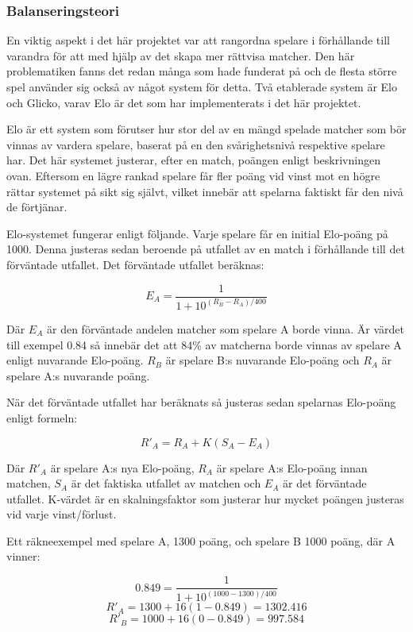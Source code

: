 \documentclass[a4paper, 11pt]{article}
\begin{document}
\subsubsection{Balanseringsteori}
En viktig aspekt i det här projektet var att rangordna spelare i förhållande till varandra för att med hjälp av det skapa mer rättvisa matcher. Den här problematiken fanns det redan många som hade funderat på och de flesta större spel använder sig också av något system för detta. Två etablerade system är Elo och Glicko, varav Elo är det som har implementerats i det här projektet.

Elo är ett system som förutser hur stor del av en mängd spelade matcher som bör vinnas av vardera spelare, baserat på en den svårighetsnivå respektive spelare har. Det här systemet justerar, efter en match, poängen enligt beskrivningen ovan. Eftersom en lägre rankad spelare får fler poäng vid vinst mot en högre rättar systemet på sikt sig självt, vilket innebär att spelarna faktiskt får den nivå de förtjänar.

Elo-systemet fungerar enligt följande. Varje spelare får en initial Elo-poäng på 1000. Denna justeras sedan beroende på utfallet av en match i förhållande till det förväntade utfallet. Det förväntade utfallet beräknas:

$$E_A = \frac{1}{1+10^{(R_B-R_A)/400}}$$

Där $E_A$ är den förväntade andelen matcher som spelare A borde vinna. Är värdet till exempel 0.84 så innebär det att 84\% av matcherna borde vinnas av spelare A enligt nuvarande Elo-poäng. $R_B$ är spelare B:s nuvarande Elo-poäng och $R_A$ är spelare A:s nuvarande poäng.

När det förväntade utfallet har beräknats så justeras sedan spelarnas Elo-poäng enligt formeln:

$$R'_A = R_A + K(S_A-E_A)$$

Där $R'_A$ är spelare A:s nya Elo-poäng, $R_A$ är spelare A:s Elo-poäng innan matchen, $S_A$ är det faktiska utfallet av matchen och $E_A$ är det förväntade utfallet. K-värdet är en skalningsfaktor som justerar hur mycket poängen justeras vid varje vinst/förlust.

Ett räkneexempel med spelare A, 1300 poäng, och spelare B 1000 poäng, där A vinner:

$$0.849 = \frac{1}{1+10^{(1000-1300)/400}}$$
$$ R'_A = 1300 + 16(1-0.849) = 1302.416 $$
$$ R'_B = 1000 + 16(0-0.849) = 997.584 $$
\end{document}
